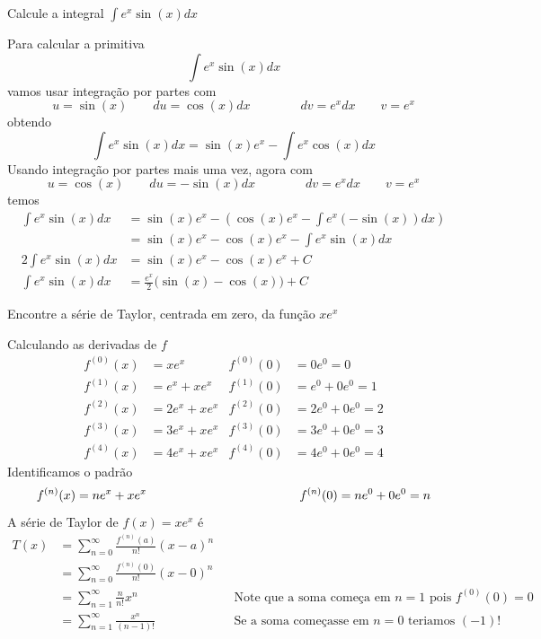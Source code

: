 \documentclass[a4paper,12pt,fleqn]{article}
\begin{document}
Calcule a integral
\(
  \int e^x \sin(x) dx
\)

\begin{answer}
  Para calcular a primitiva
  \[
    \int e^x \sin(x) dx
  \]
  vamos usar integração por partes com
  \[
    u = \sin(x) \qquad du = \cos(x)dx \qquad\qquad
    dv = e^xdx \qquad v = e^x
  \]
  obtendo
  \[
    \int e^x \sin(x) dx = \sin(x)e^x - \int e^x \cos(x) dx
  \]
  Usando integração por partes mais uma vez, agora com
  \[
    u = \cos(x) \qquad du = -\sin(x)dx \qquad\qquad
    dv = e^xdx \qquad v = e^x
  \]
  temos
  \begin{align*}
    \int e^x \sin(x) dx   & = \sin(x)e^x - \left( \cos(x)e^x - \int e^x(-\sin(x))dx\right) \\[2mm]
                          & = \sin(x)e^x - \cos(x)e^x - \int e^x\sin(x)dx                  \\[2mm]
    2 \int e^x \sin(x) dx & = \sin(x)e^x - \cos(x)e^x + C                                  \\[2mm]
    \int e^x \sin(x) dx   & = \frac{e^x}{2}\big(\sin(x) - \cos(x)\big) + C
  \end{align*}


  \clearpage
\end{answer}

Encontre a série de Taylor, centrada em zero, da função \(xe^x\)

\begin{answer}
  Calculando as derivadas de $f$
  \begin{align*}
    f^{(0)}(x) & = xe^x       & f^{(0)}(0) & = 0e^0 = 0       \\
    f^{(1)}(x) & = e^x + xe^x & f^{(1)}(0) & = e^0 + 0e^0 = 1 \\
    f^{(2)}(x) & = 2e^x + xe^x & f^{(2)}(0) & = 2e^0 + 0e^0 = 2 \\
    f^{(3)}(x) & = 3e^x + xe^x & f^{(3)}(0) & = 3e^0 + 0e^0 = 3 \\
    f^{(4)}(x) & = 4e^x + xe^x & f^{(4)}(0) & = 4e^0 + 0e^0 = 4
  \end{align*}
  Identificamos o padrão
  \[
    f^{(n)}(x) = ne^x + xe^x \hspace{43mm} f^{(n)}(0) = ne^0 + 0e^0 = n
  \]
  A série de Taylor de \(f(x)=xe^x\) é
  \begin{align*}
    T(x) & = \sum_{n=0}^\infty \frac{f^{(n)}(a)}{n!} (x-a)^n \\[2mm]
         & = \sum_{n=0}^\infty \frac{f^{(n)}(0)}{n!} (x-0)^n \\[2mm]
         & = \sum_{n=1}^\infty \frac{n}{n!} x^n
         & & \text{Note que a soma começa em } n=1 \text{ pois } f^{(0)}(0) = 0\\[2mm]
         & = \sum_{n=1}^\infty \frac{x^n}{(n-1)!}
         & & \text{Se a soma começasse em } n = 0 \text{ teriamos } (-1)!
  \end{align*}
\end{answer}

\end{document}
